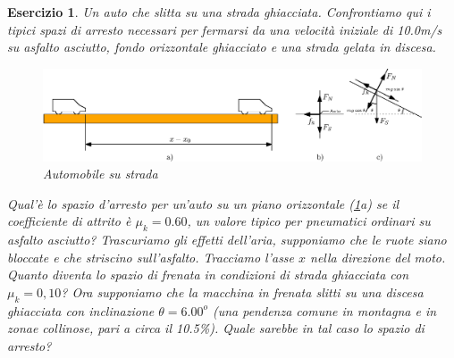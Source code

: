 \documentclass{article}
\newtheorem{es}{Esercizio}[section]
\begin{document}
\clearpage
\begin{es}
  Un auto che slitta su una strada ghiacciata. Confrontiamo qui i tipici spazi di arresto necessari per fermarsi da una velocità iniziale di 10.0m/s su asfalto asciutto, fondo orizzontale ghiacciato e una strada gelata in discesa.
  \begin{figure}[ht!]
    \centering
    \includegraphics[scale=0.9]{img/auto.eps}
    \caption{Automobile su strada}
    \label{fig:autosust}
  \end{figure}
  \begin{tasks}
    \task Qual'è lo spazio d'arresto per un'auto su un piano orizzontale (\ref{fig:autosust}a) se il coefficiente di attrito è $\mu_k=0.60$, un valore tipico per pneumatici ordinari su asfalto asciutto? Trascuriamo gli effetti dell'aria, supponiamo che le ruote siano bloccate e che striscino sull'asfalto. Tracciamo l'asse $x$ nella direzione del moto.
    \task Quanto diventa lo spazio di frenata in condizioni di strada ghiacciata con $\mu_k=0,10$?
    \task Ora supponiamo che la macchina in frenata slitti su una discesa ghiacciata con inclinazione $\theta=6.00^o$ (una pendenza comune in montagna e in zonae collinose, pari a circa il 10.5\%). Quale sarebbe in tal caso lo spazio di arresto?
  \end{tasks}
\end{es}
\end{document}
